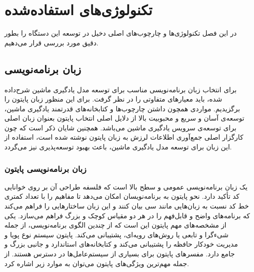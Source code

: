 \chapter{تکنولوژی‌های استفاده‌شده}

در این فصل تکنولوژی‌ها و چارچوب‌های اصلی دخیل در توسعه این دستگاه را بطور دقیق مورد بررسی قرار می‌دهیم.

\section{‌‌زبان برنامه‌نویسی}
برای انتخاب زبان برنامه‌نویسی مناسب برای توسعه مدل یادگیری ماشین شرح‌داده شده، باید معیارهای متفاوتی را در نظر گرفت. برای این منظور زبان پایتون را برگزیدیم. مواردی همچون داشتن چارچوب‌ها و کتابخانه‌های قدرتمند یادگیری ماشین، توسعه‌ی آسان و سریع و محبوبیت بالا از دلایل اصلی انتخاب پایتون بعنوان زبان اصلی برای توسعه‌ی سرویس یادگیری ماشین می‌باشد. همچنین شایان ذکر است که چون کارگزار اصلی جمع‌آوری اطلاعات لرزش به زبان پایتون نوشته شده است، استفاده از این زبان برای توسعه مدل یادگیری ماشین، باعث بهبود توسعه‌پذیری نیز می‌گردد. 

\subsection{زبان برنامه‌نویسی پایتون}
یک زبان برنامه‌نویسی عمومی و سطح بالا است که فلسفه طراحی آن بر روی خوانایی کد تأکید دارد. نحو پایتون به برنامه‌نویسان امکان می‌دهد تا مفاهیم را با تعداد کمتری خط کد نسبت به زبان‌هایی مانند سی بیان کنند و این زبان ساختارهایی را فراهم می‌کند که برنامه‌های واضح و قابل‌فهم را در هر دو مقیاس کوچک و بزرگ فراهم می‌سازد\cite{van2007python}. یکی از مشخصه‌های مهم پایتون این است که از چندین الگوی برنامه‌نویسی، از جمله شیءگرا و تابعی یا روش‌های رویه‌ای، پشتیبانی می‌کند. پایتون سیستم نوع پویا و مدیریت خودکار حافظه را پشتیبانی می‌کند و کتابخانه‌های استاندارد و جانبی بزرگ و جامع دارد. مفسرهای پایتون برای بسیاری از سیستم‌عامل‌ها در دسترس هستند\cite{srinath2017python}. از جمله مهم‌ترین ویژگی‌های پایتون می‌توان به موارد زیر اشاره کرد.

